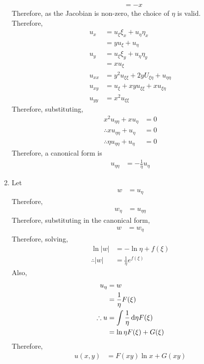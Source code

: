\documentclass[titlepage, fleqn, a4paper, 12pt, twoside]{article}
\theoremstyle{definition}
\theoremstyle{theorem}
\begin{document}
\begin{solution}
\begin{enumerate}[leftmargin=*]
\begin{align*}
				&= -x
			\end{align*}
			Therefore, as the Jacobian is non-zero, the choice of $\eta$ is valid.\\
			Therefore,
			\begin{align*}
				u_x     & = u_{\xi} \xi_x + u_{\eta} \eta_x                    \\
                                        & = y u_{\xi} + u_{\eta}                               \\
				u_y     & = u_{\xi} \xi_y + u_{\eta} \eta_y                    \\
                                        & = x u_{\xi}                                          \\
				u_{x x} & = y^2 u_{\xi \xi} + 2 y U_{\xi \eta} + u_{\eta \eta} \\
				u_{x y} & = u_{\xi} + x y u_{\xi \xi} + x u_{\xi \eta}         \\
				u_{y y} & = x^2 u_{\xi \xi}
			\end{align*}
			Therefore, substituting,
			\begin{align*}
				x^2 u_{\eta \eta} + x u_{\eta}           & = 0 \\
				\therefore x u_{\eta \eta} + u_{\eta}    & = 0 \\
				\therefore \eta u_{\eta \eta} + u_{\eta} & = 0
			\end{align*}
			Therefore, a canonical form is
			\begin{align*}
				u_{\eta \eta} & = -\frac{1}{\eta} u_{\eta}
			\end{align*}
		\item
			Let
			\begin{align*}
				w & = u_{\eta}
			\end{align*}
			Therefore,
			\begin{align*}
				w_{\eta} & = u_{\eta \eta}
			\end{align*}
			Therefore, substituting in the canonical form,
			\begin{align*}
				w & = w_{\eta}
			\end{align*}
			Therefore, solving,
			\begin{align*}
				\ln|w|         & = -\ln \eta + f(\xi) \\
				\therefore |w| & = \frac{1}{\eta} e^{f(\xi)}
			\end{align*}
			Also,
			\begin{align*}
				u_{\eta}     & = w                                    \\
                                             & = \frac{1}{\eta} F(\xi)                \\
				\therefore u & = \int \frac{1}{\eta} \dif \eta F(\xi) \\
                                             & = \ln \eta F(\xi) + G(\xi)
			\end{align*}
			Therefore,
			\begin{align*}
				u(x,y) & = F(x y) \ln x + G(x y)
			\end{align*}
	\end{enumerate}
\end{solution}
\end{document}
